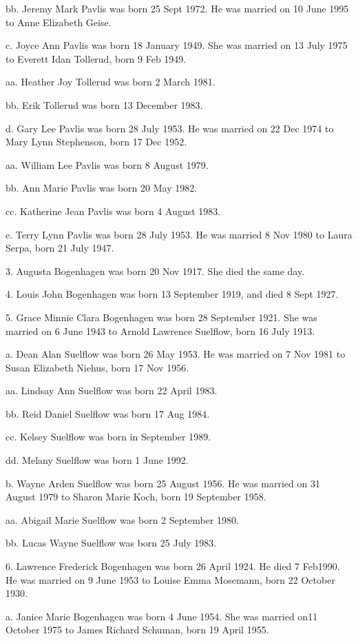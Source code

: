 \documentclass[a4paper]{article}
\begin{document}
bb. Jeremy Mark Pavlis was born 25 Sept 1972.  He was married on 10 June 1995 to Anne Elizabeth Geise.

c. Joyce Ann Pavlis was born 18 January 1949.  She was married on 13 July 1975 to Everett Idan Tollerud, born 9 Feb 1949.

aa. Heather Joy Tollerud was born 2 March 1981.

bb. Erik Tollerud was born 13 December 1983.  

d. Gary Lee Pavlis was born 28 July 1953.  He was married on 22 Dec 1974 to Mary Lynn Stephenson, born 17 Dec 1952.
 
aa. William Lee Pavlis was born 8 August 1979.

bb. Ann Marie Pavlis was born 20 May 1982.

cc. Katherine Jean Pavlis was born 4 August 1983.

e. Terry Lynn Pavlis was born 28 July 1953.  He was married 8 Nov 1980 to Laura Serpa, born 21 July 1947.

3. Augusta Bogenhagen was born 20 Nov 1917. She died the same day.

4. Louis John Bogenhagen was born 13 September 1919, and died 8 Sept 1927.

5. Grace Minnie Clara Bogenhagen was born 28 September 1921.  She was married on 6 June 1943 to Arnold Lawrence Suelflow, born 16 July 1913.

a. Dean Alan Suelflow was born 26 May 1953.  He was married on 7 Nov 1981 to Susan Elizabeth Niehus, born 17 Nov 1956.

aa. Lindsay Ann Suelflow was born 22 April 1983.

bb. Reid Daniel Suelflow was born 17 Aug 1984.

cc. Kelsey Suelflow was born in September 1989.

dd. Melany Suelflow was born 1 June 1992.

b. Wayne Arden Suelflow was born 25 August 1956.  He was married on 31 August 1979 to Sharon Marie Koch, born 19 September 1958.

aa. Abigail Marie Suelflow was born 2 September 1980.

bb. Lucas Wayne Suelflow was born 25 July 1983.

6. Lawrence Frederick Bogenhagen was born 26 April 1924.  He died 7 Feb1990. He was married on 9 June 1953 to Louise Emma Mosemann, born 22 October 1930.

a. Janice Marie Bogenhagen was born 4 June 1954.  She was married on11 October 1975 to James Richard Schuman,  born 19 April 1955.
\end{document}
